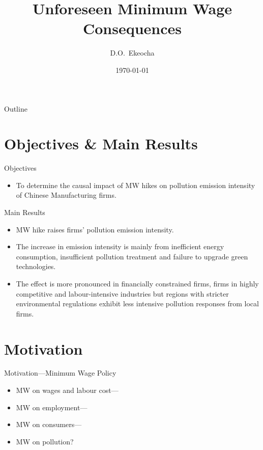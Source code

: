 \documentclass[aspectratio = 169]{beamer}
\title[]{Unforeseen Minimum Wage Consequences}
\author[Ekeocha]{
    D.O.~Ekeocha\inst{1}
}
\institute[]{
    \inst{1}
    University of Liverpool Management School
}
\date{\today}
\begin{document}
    \maketitle

    \begin{frame}{Outline}
        \tableofcontents
    \end{frame}


    \section{Objectives \& Main Results}\label{sec:objectives-and-main-results}
    \begin{frame}{Objectives}
        \begin{itemize}
            \item To determine the causal impact of MW hikes on pollution emission intensity of Chinese Manufacturing firms.
        \end{itemize}
    \end{frame}

    \begin{frame}{Main Results}
        \begin{itemize}
            \item MW hike raises firms' pollution emission intensity.
            \item The increase in emission intensity is mainly from inefficient energy consumption, insufficient pollution treatment and failure to upgrade green technologies.
            \item The effect is more pronounced in financially constrained firms, firms in highly competitive and labour-intensive industries but regions with stricter
            environmental regulations exhibit less intensive pollution responses from local firms.
        \end{itemize}
    \end{frame}


    \section{Motivation}\label{sec:motivation}
    \begin{frame}{Motivation---Minimum Wage Policy}
        \begin{itemize}
            \item MW on wages and labour cost---\parencite{coviello2022minimum, alexandre2022minimum}
            \item MW on employment---\parencite{brown1999minimum, neumark1992employment, card2000minimum, cengiz2019effect, dustmann2022reallocation}
            \item MW on consumers---\parencite{harasztosi2019pays}
            \item MW on pollution?
        \end{itemize}
    \end{frame}
\end{document}

